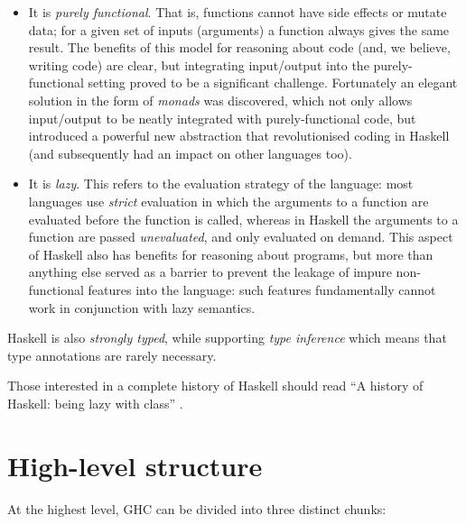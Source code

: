 \documentclass{article}
\let\cite=\citep
\begin{document}
\begin{itemize}
\item It is \emph{purely functional}.  That is, functions cannot
  have side effects or mutate data; for a given set of inputs
  (arguments) a function always gives the same result.  The benefits
  of this model for reasoning about code (and, we believe, writing
  code) are clear, but integrating input/output into the
  purely-functional setting proved to be a significant challenge.
  Fortunately an elegant solution in the form of \emph{monads} was
  discovered, which not only allows input/output to be neatly
  integrated with purely-functional code, but introduced a powerful
  new abstraction that revolutionised coding in Haskell (and
  subsequently had an impact on other languages too).

\item It is \emph{lazy}.  This refers to the evaluation strategy of
  the language: most languages use \emph{strict} evaluation in which
  the arguments to a function are evaluated before the function is
  called, whereas in Haskell the arguments to a function are passed
  \emph{unevaluated}, and only evaluated on demand.  This aspect of
  Haskell also has benefits for reasoning about programs, but more
  than anything else served as a barrier to prevent the leakage of
  impure non-functional features into the language: such features
  fundamentally cannot work in conjunction with lazy semantics.
\end{itemize}

Haskell is also \emph{strongly typed}, while supporting \emph{type
  inference} which means that type annotations are rarely necessary.

Those interested in a complete history of Haskell should read ``A
history of Haskell: being lazy with class'' \cite{haskellhistory}.

\section{High-level structure}

At the highest level, GHC can be divided into three distinct chunks:
\end{document}
